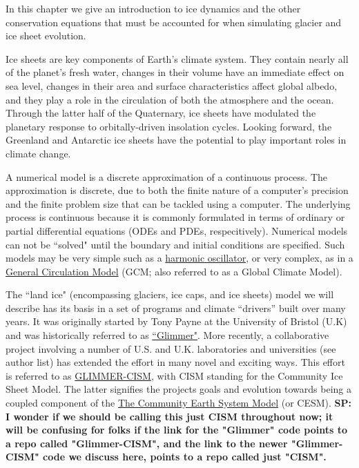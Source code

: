 
In this chapter we give an introduction to ice dynamics and the other conservation equations
that must be accounted for when simulating glacier and ice sheet evolution.

Ice sheets are key components of Earth's climate system. They contain
nearly all of the planet's fresh water, changes in their volume have an
immediate effect on sea level, changes in their area and surface
characteristics affect global albedo, and they play a role in the
circulation of both the atmosphere and the ocean. Through the latter
half of the Quaternary, ice sheets have modulated the planetary response
to orbitally-driven insolation cycles. Looking forward, the Greenland
and Antarctic ice sheets have the potential to play important roles in
climate change.

A numerical model is a discrete approximation of a continuous process.
The approximation is discrete, due to both the finite nature of a computer's
precision and the finite problem size that can be tackled using a computer. 
The underlying process is continuous because it is commonly
formulated in terms of ordinary or partial differential equations (ODEs and PDEs,
respecitively). Numerical models can not be ``solved" until the boundary and
initial conditions are specified. Such models may be very simple such as
a \href{http://en.wikipedia.org/wiki/Harmonic_oscillator}{harmonic oscillator},
or very complex, as in a \href{http://en.wikipedia.org/wiki/General_Circulation_Model}
{General Circulation Model} (GCM; also referred to as a Global Climate Model).

The ``land ice" (encompassing glaciers, ice caps, and ice sheets) model we will describe 
has its basis in a set of programs and climate ``drivers'' built over many years. It was 
originally started by Tony Payne at the University of Bristol (U.K) and was historically 
referred to as \href{https://github.com/glimmer-cism}{``Glimmer"}. 
More recently, a collaborative project involving a number of U.S. and U.K. laboratories and
universities (see author list) has extended the effort in many novel and exciting ways. This effort is
referred to as \href{http://our.lanl.url.here}{GLIMMER-CISM}, with CISM standing for the Community 
Ice Sheet Model. The latter signifies the projects goals and evolution towards being a coupled
component of the \href{http://www2.cesm.ucar.edu/}{The Community Earth System Model} (or CESM). 
\textbf{SP: I wonder if we should be calling this just CISM throughout now; it will be confusing for
folks if the link for the "Glimmer" code points to a repo called "Glimmer-CISM", and the link to the
newer "Glimmer-CISM" code we discuss here, points to a repo called just "CISM".}

